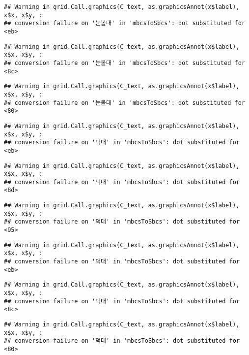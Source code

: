 \documentclass[
]{article}
\begin{document}
\begin{verbatim}
## Warning in grid.Call.graphics(C_text, as.graphicsAnnot(x$label), x$x, x$y, :
## conversion failure on '눈볼대' in 'mbcsToSbcs': dot substituted for <eb>
\end{verbatim}

\begin{verbatim}
## Warning in grid.Call.graphics(C_text, as.graphicsAnnot(x$label), x$x, x$y, :
## conversion failure on '눈볼대' in 'mbcsToSbcs': dot substituted for <8c>
\end{verbatim}

\begin{verbatim}
## Warning in grid.Call.graphics(C_text, as.graphicsAnnot(x$label), x$x, x$y, :
## conversion failure on '눈볼대' in 'mbcsToSbcs': dot substituted for <80>
\end{verbatim}

\begin{verbatim}
## Warning in grid.Call.graphics(C_text, as.graphicsAnnot(x$label), x$x, x$y, :
## conversion failure on '덕대' in 'mbcsToSbcs': dot substituted for <eb>
\end{verbatim}

\begin{verbatim}
## Warning in grid.Call.graphics(C_text, as.graphicsAnnot(x$label), x$x, x$y, :
## conversion failure on '덕대' in 'mbcsToSbcs': dot substituted for <8d>
\end{verbatim}

\begin{verbatim}
## Warning in grid.Call.graphics(C_text, as.graphicsAnnot(x$label), x$x, x$y, :
## conversion failure on '덕대' in 'mbcsToSbcs': dot substituted for <95>
\end{verbatim}

\begin{verbatim}
## Warning in grid.Call.graphics(C_text, as.graphicsAnnot(x$label), x$x, x$y, :
## conversion failure on '덕대' in 'mbcsToSbcs': dot substituted for <eb>
\end{verbatim}

\begin{verbatim}
## Warning in grid.Call.graphics(C_text, as.graphicsAnnot(x$label), x$x, x$y, :
## conversion failure on '덕대' in 'mbcsToSbcs': dot substituted for <8c>
\end{verbatim}

\begin{verbatim}
## Warning in grid.Call.graphics(C_text, as.graphicsAnnot(x$label), x$x, x$y, :
## conversion failure on '덕대' in 'mbcsToSbcs': dot substituted for <80>
\end{verbatim}
\end{document}
